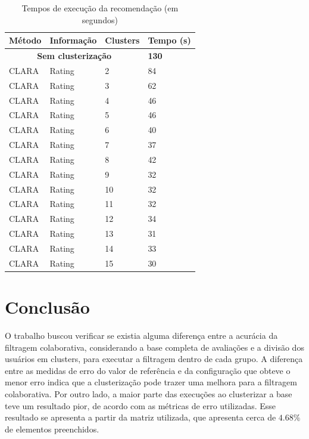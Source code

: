 \documentclass[12pt,a4paper,header]{abnt}
\begin{document}
\begin{longtable}{@{}llll@{}}
\caption{Tempos de execução da recomendação (em segundos)}
\label{tempos}\\
\toprule
\textbf{Método} & \textbf{Informação} & \textbf{Clusters} & \textbf{Tempo (s)} \\  \midrule
\endhead
%
\multicolumn{3}{c}{\textbf{Sem clusterização}}                     & \textbf{130}                \\
CLARA           & Rating              & 2                 & 84                 \\
CLARA           & Rating              & 3                 & 62                 \\
CLARA           & Rating              & 4                 & 46                 \\
CLARA           & Rating              & 5                 & 46                 \\
CLARA           & Rating              & 6                 & 40                 \\
CLARA           & Rating              & 7                 & 37                 \\
CLARA           & Rating              & 8                 & 42                 \\
CLARA           & Rating              & 9                 & 32                 \\
CLARA           & Rating              & 10                & 32                 \\
CLARA           & Rating              & 11                & 32                 \\
CLARA           & Rating              & 12                & 34                 \\
CLARA           & Rating              & 13                & 31                 \\
CLARA           & Rating              & 14                & 33                 \\
CLARA           & Rating              & 15                & 30 \\ \bottomrule                
\end{longtable}  

\chapter{Conclusão}

O trabalho buscou verificar se existia alguma diferença entre a acurácia da filtragem colaborativa, considerando a base completa de avaliações e a divisão dos usuários em clusters, para executar a filtragem dentro de cada grupo. A diferença entre as medidas de erro do valor de referência e da configuração que obteve o menor erro indica que a clusterização pode trazer uma melhora para a filtragem colaborativa. Por outro lado, a maior parte das execuções ao clusterizar a base teve um resultado pior, de acordo com as métricas de erro utilizadas. Esse resultado se apresenta a partir da matriz utilizada, que apresenta cerca de $4.68\%$ de elementos preenchidos. 
\end{document}
